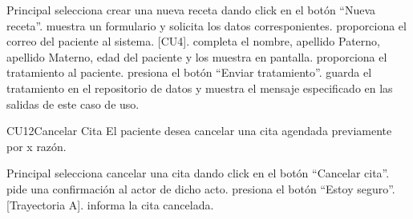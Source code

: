 \begin{UCtrayectoria}{Principal}
	\UCpaso[\UCactor] selecciona crear una nueva receta dando click en el botón ``Nueva receta''.
	\UCpaso muestra un formulario y solicita los datos corresponientes.
	\UCpaso[\UCactor] proporciona el correo del paciente al sistema. [CU4].
	\UCpaso completa el nombre, apellido Paterno, apellido Materno, edad del paciente y los muestra en pantalla.
	\UCpaso[\UCactor] proporciona el tratamiento al paciente.
	\UCpaso[\UCactor] presiona el botón ``Enviar tratamiento''.
	\UCpaso guarda el tratamiento en el repositorio de datos y muestra el mensaje especificado en las salidas de este caso de uso.
\end{UCtrayectoria}
	\begin{UseCase}{CU12}{Cancelar Cita
}{El paciente desea cancelar una cita agendada previamente por x razón. 
}

	\end{UseCase}
\begin{UCtrayectoria}{Principal}
	\UCpaso[\UCactor] selecciona cancelar una cita dando click en el botón ``Cancelar cita''.
	\UCpaso pide una confirmación al actor de dicho acto.
	\UCpaso[\UCactor] presiona el botón ``Estoy seguro''. [Trayectoria A].
	\UCpaso informa la cita cancelada.
\end{UCtrayectoria}

